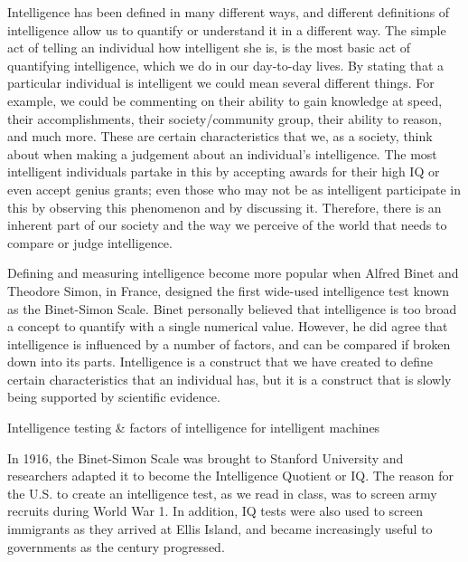 \documentclass[11pt]{article}
\begin{document}
\par Intelligence has been defined in many different ways, and different definitions of intelligence allow us to quantify or understand it in a different way. The simple act of telling an individual how intelligent she is, is the most basic act of quantifying intelligence, which we do in our day-to-day lives. By stating that a particular individual is intelligent we could mean several different things. For example, we could be commenting on their ability to gain knowledge at speed, their accomplishments, their society/community group, their ability to reason, and much more. These are certain characteristics that we, as a society, think about when making a judgement about an individual's intelligence. The most intelligent individuals partake in this by accepting awards for their high IQ or even accept genius grants; even those who may not be as intelligent participate in this by observing this phenomenon and by discussing it. Therefore, there is an inherent part of our society and the way we perceive of the world that needs to compare or judge intelligence.

\par Defining and measuring intelligence become more popular when Alfred Binet and Theodore Simon, in France, designed the first wide-used intelligence test known as the Binet-Simon Scale. Binet personally believed that intelligence is too broad a concept to quantify with a single numerical value. However, he did agree that intelligence is influenced by a number of factors, and can be compared if broken down into its parts. Intelligence is a construct that we have created to define certain characteristics that an individual has, but it is a construct that is slowly being supported by scientific evidence.

\begin{center}
	{\large Intelligence testing \& factors of intelligence for intelligent machines\par}
\end{center}

\par In 1916, the Binet-Simon Scale was brought to Stanford University and researchers adapted it to become the Intelligence Quotient or IQ. The reason for the U.S. to create an intelligence test, as we read in class, was to screen army recruits during World War 1. In addition, IQ tests were also used to screen immigrants as they arrived at Ellis Island, and became increasingly useful to governments as the century progressed. 
\end{document}
